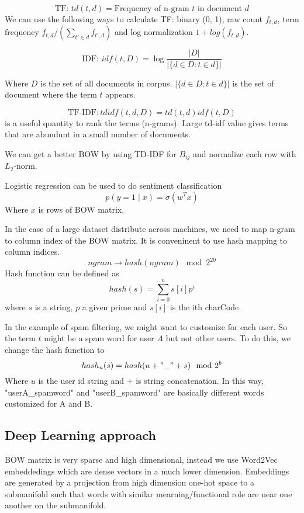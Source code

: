 \documentclass[twocolumn, 10pt]{article}
\begin{document}
$$ \mbox{TF: }  td(t, d) = \mbox{Frequency of n-gram  } t \mbox{ in document } d $$
We can use the following ways to calculate TF: binary (0, 1),  raw count $f_{t, d}$,  term frequency $f_{t,d} /  \left(\sum_{t' \in d} f_{t', d}\right)$ and log normalization $1+ log(f_{t, d})$.

$$\mbox{IDF: } idf(t, D) = \log{\frac{|D|}{|\{d \in D: t \in d \}|}} $$

Where $D$ is the set of all documents in corpus. $|\{d \in D: t \in d \}|$ is the set of document where the term $t$ appears.

$$\mbox{TF-IDF}: tdidf(t, d, D) = td(t, d) idf(t, D)$$
is a useful quantity to rank the terms (n-grams). Large td-idf value gives terms that are abundunt in a small number of documents. 

We can get a better BOW by using TD-IDF for $B_{ij}$ and normalize each row with $L_2$-norm.

Logistic regression can be used to do sentiment classification 
$$p(y = 1 \mid x) = \sigma(w^T x)$$ 
Where $x$ is rows of BOW matrix.

In the case of a large dataset distribute across machines, we need to map n-gram to column index of the BOW matrix. It is conveninent to use hash mapping to column indices.
$$ ngram \rightarrow hash(ngram) \mod 2^{20} $$
Hash function can be defined as 
$$ hash(s) = \sum_{i = 0}^n  s[i] p^i $$
where $s$ is a string, $p$ a given prime and $s[i]$ is the ith charCode.

In the example of spam filtering, we might want to customize for each user. So the term $t$ might be a spam word for user $A$ but not other users.  To do this, we change the hash function to 
$$ hash_u (s) = hash(u + "\_" + s) \mod 2^b$$
Where $u$ is the user id string and $+$ is string concatenation. In this way, "userA\_spamword" and "userB\_spamword" are basically different words customized for A and B.

\subsection*{Deep Learning approach}

BOW matrix is very sparse and high dimensional, instead we use Word2Vec embeddedings which are dense vectors in a much lower dimension. Embeddings are generated by a projection from high dimension one-hot space to a submanifold such that words with similar mearning/functional role  are near one another on the submanifold.  
\end{document}
